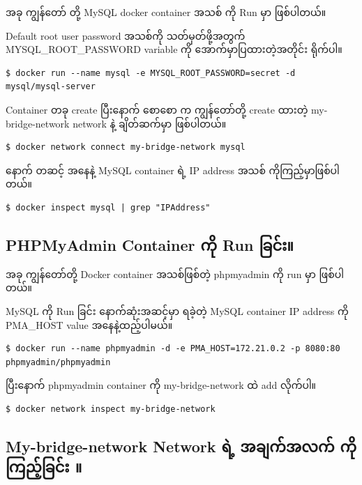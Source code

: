 အခု ကျွန်တော် တို့ MySQL docker container အသစ် ကို Run မှာ ဖြစ်ပါတယ်။

Default root user password အသစ်ကို သတ်မှတ်ဖို့အတွက်
MYSQL\_ROOT\_PASSWORD variable ကို အောက်မှာပြထားတဲ့အတိုင်း ရိုက်ပါ။

\begin{verbatim}
$ docker run --name mysql -e MYSQL_ROOT_PASSWORD=secret -d mysql/mysql-server
\end{verbatim}

Container တခု create ပြီးနောက် စောစော က ကျွန်တော်တို့ create ထားတဲ့
my-bridge-network network နဲ့ ချိတ်ဆက်မှာ ဖြစ်ပါတယ်။

\begin{verbatim}
$ docker network connect my-bridge-network mysql
\end{verbatim}

နောက် တဆင့် အနေနဲ့ MySQL container ရဲ့ IP address အသစ်
ကိုကြည့်မှာဖြစ်ပါတယ်။

\begin{verbatim}
$ docker inspect mysql | grep "IPAddress"
\end{verbatim}

\hypertarget{phpmyadmin-container-ux1000ux102dux102f-run-ux1001ux103cux1004ux103aux1038}{%
\subsection{PHPMyAdmin Container ကို Run
ခြင်း။}\label{phpmyadmin-container-ux1000ux102dux102f-run-ux1001ux103cux1004ux103aux1038}}

အခု ကျွန်တော်တို့ Docker container အသစ်ဖြစ်တဲ့ phpmyadmin ကို run မှာ
ဖြစ်ပါတယ်။

MySQL ကို Run ခြင်း နောက်ဆုံးအဆင့်မှာ ရခဲ့တဲ့ MySQL container IP address
ကို PMA\_HOST value အနေနဲ့ထည့်ပါမယ်။

\begin{verbatim}
$ docker run --name phpmyadmin -d -e PMA_HOST=172.21.0.2 -p 8080:80 phpmyadmin/phpmyadmin
\end{verbatim}

ပြီးနောက် phpmyadmin container ကို my-bridge-network ထဲ add လိုက်ပါ။

\begin{verbatim}
$ docker network inspect my-bridge-network
\end{verbatim}

\hypertarget{my-bridge-network-network-ux101bux1032ux1037-ux1021ux1001ux103bux1000ux103aux1021ux101cux1000ux103a-ux1000ux102dux102fux1000ux103cux100aux1037ux103aux1001ux103cux1004ux103aux1038}{%
\subsection{My-bridge-network Network ရဲ့ အချက်အလက် ကိုကြည့်ခြင်း
။}\label{my-bridge-network-network-ux101bux1032ux1037-ux1021ux1001ux103bux1000ux103aux1021ux101cux1000ux103a-ux1000ux102dux102fux1000ux103cux100aux1037ux103aux1001ux103cux1004ux103aux1038}}

